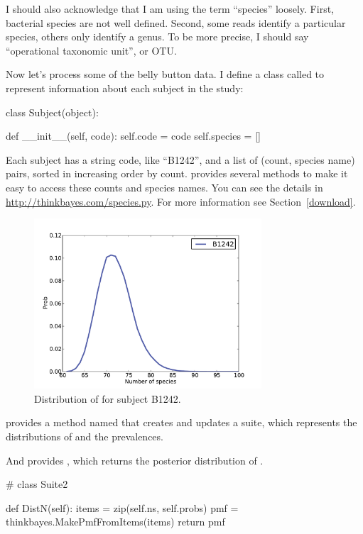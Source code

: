 \documentclass[12pt]{book}
\theoremstyle{exercise}
\begin{document}
I should also acknowledge that I am using the term ``species''
loosely.  First, bacterial species are not well defined.  Second,
some reads identify a particular species, others only identify
a genus.  To be more precise, I should say ``operational
taxonomic unit'', or OTU.

Now let's process some of the belly button data.  I define
a class called  to represent information about
each subject in the study:

\begin{code}
class Subject(object):

    def __init__(self, code):
        self.code = code
        self.species = []
\end{code}

Each subject has a string code, like ``B1242'', and a list of
(count, species name) pairs, sorted in increasing order by count.
 provides several methods to make it
easy to access these counts and species names.  You can see the details
in \url{http://thinkbayes.com/species.py}.
  For more information
see Section~\ref{download}.

\begin{figure}
\centerline{\includegraphics[height=2.5in]{figs/species-ndist-B1242.pdf}}
\caption{Distribution of  for subject B1242.}
\label{species-ndist}
\end{figure}

 provides a method named  that creates and
updates a  suite,
which represents the distributions of  and the prevalences.

And  provides , which returns the posterior
distribution of .

\begin{code}
# class Suite2

    def DistN(self):
        items = zip(self.ns, self.probs)
        pmf = thinkbayes.MakePmfFromItems(items)
        return pmf
\end{code}
\end{document}

